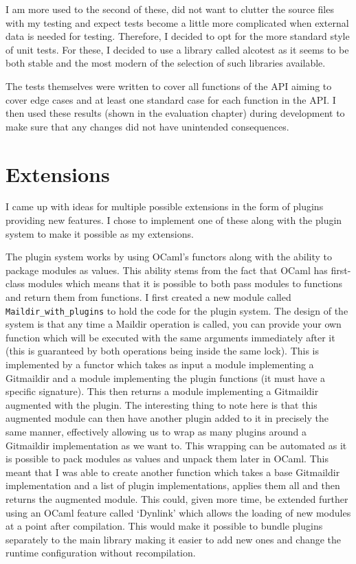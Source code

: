 I am more used to the second of these, did not want to clutter the source files with my testing and expect tests become a little more complicated when external data is needed for testing. Therefore, I decided to opt for the more standard style of unit tests. For these, I decided to use a library called alcotest\cite{code_alcotest} as it seems to be both stable and the most modern of the selection of such libraries available.

The tests themselves were written to cover all functions of the API aiming to cover edge cases and at least one standard case for each function in the API. I then used these results (shown in the evaluation chapter) during development to make sure that any changes did not have unintended consequences.

\section{Extensions} \label{section:extensions}

I came up with ideas for multiple possible extensions in the form of plugins providing new features. I chose to implement one of these along with the plugin system to make it possible as my extensions.

The plugin system works by using OCaml's functors along with the ability to package modules as values. This ability stems from the fact that OCaml has first-class modules which means that it is possible to both pass modules to functions and return them from functions. I first created a new module called \texttt{Maildir\_with\_plugins} to hold the code for the plugin system. The design of the system is that any time a Maildir operation is called, you can provide your own function which will be executed with the same arguments immediately after it (this is guaranteed by both operations being inside the same lock). This is implemented by a functor which takes as input a module implementing a Gitmaildir and a module implementing the plugin functions (it must have a specific signature). This then returns a module implementing a Gitmaildir augmented with the plugin. The interesting thing to note here is that this augmented module can then have another plugin added to it in precisely the same manner, effectively allowing us to wrap as many plugins around a Gitmaildir implementation as we want to. This wrapping can be automated as it is possible to pack modules as values and unpack them later in OCaml. This meant that I was able to create another function which takes a base Gitmaildir implementation and a list of plugin implementations, applies them all and then returns the augmented module. This could, given more time, be extended further using an OCaml feature called `Dynlink' which allows the loading of new modules at a point after compilation. This would make it possible to bundle plugins separately to the main library making it easier to add new ones and change the runtime configuration without recompilation.


